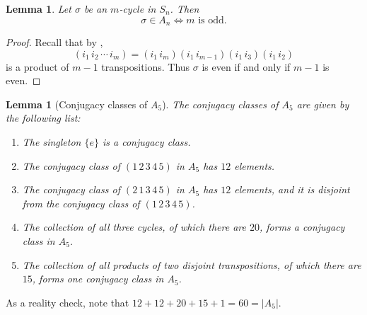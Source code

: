\documentclass[12pt]{report}
\newtheorem{lemma}[theorem]{Lemma}
\numberwithin{equation}{section}
\numberwithin{theorem}{chapter}
\theoremstyle{definition}
\newtheorem*{basic properties}{Basic Properties}
\newtheorem*{Important Remark}{Important Remark}
\begin{document}
\begin{lemma}\label{cycle types in An}
Let $\sigma$ be an $m$-cycle in $S_n$. Then
$$\sigma \in A_n \iff m \textrm{ is odd}.$$
\end{lemma}


\begin{proof}
Recall that by ,
$$(i_1 \, i_2 \, \cdots \, i_m) = (i_1 \, i_m) (i_1 \, i_{m-1}) (i_1 \, i_3) (i_1 \, i_2)$$
is a product of $m-1$ transpositions.
Thus $\sigma$ is even if and only if $m-1$ is even.
\end{proof}


\begin{lemma}[Conjugacy classes of $A_5$]\label{conjugacy classes of A5}
The conjugacy classes of $A_5$ are given by the following list:
\begin{enumerate}[itemsep=-0.1em]
\item The singleton $\{e\}$ is a conjugacy class.
\item The conjugacy class of $(1 \, 2 \, 3 \, 4 \, 5)$ in $A_5$ has $12$ elements.
\item The conjugacy class of $(2 \, 1 \, 3 \, 4 \, 5)$ in $A_5$ has $12$ elements, and it is disjoint from the conjugacy class of $(1 \, 2 \, 3 \, 4 \, 5)$. 
\item The collection of all three cycles, of which there are $20$, forms a conjugacy class in $A_5$.
\item The collection of all products of two disjoint transpositions, of which there are $15$, forms one conjugacy class in $A_5$.
\end{enumerate}
\end{lemma}


As a reality check, note that $12 + 12 + 20 + 15 + 1 = 60 = |A_5|$.
\end{document}
